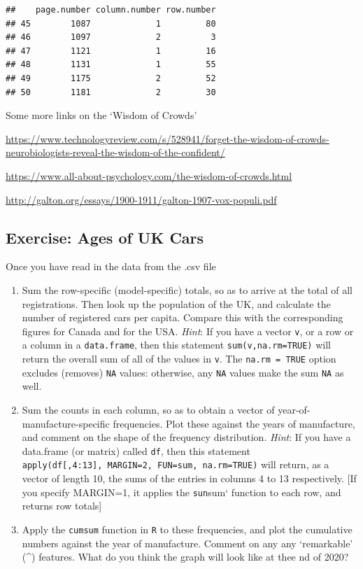 \documentclass[]{book}
\begin{document}
\begin{verbatim}
##    page.number column.number row.number
## 45        1087             1         80
## 46        1097             2          3
## 47        1121             1         16
## 48        1131             1         55
## 49        1175             2         52
## 50        1181             2         30
\end{verbatim}

Some more links on the `Wisdom of Crowds'

\url{https://www.technologyreview.com/s/528941/forget-the-wisdom-of-crowds-neurobiologists-reveal-the-wisdom-of-the-confident/}

\url{https://www.all-about-psychology.com/the-wisdom-of-crowds.html}

\url{http://galton.org/essays/1900-1911/galton-1907-vox-populi.pdf}

\hypertarget{exercise-ages-of-uk-cars}{%
\subsection{Exercise: Ages of UK Cars}\label{exercise-ages-of-uk-cars}}

Once you have read in the data from the .csv file

\begin{enumerate}
\def\labelenumi{\arabic{enumi}.}
\item
  Sum the row-specific (model-specific) totals, so as to arrive at the total of all registrations. Then look up the population of the UK, and calculate the number of registered cars per capita. Compare this with the corresponding figures for Canada and for the USA. \emph{Hint}: If you have a vector \texttt{v}, or a row or a column in a \texttt{data.frame}, then this statement \texttt{sum(v,na.rm=TRUE)} will return the overall sum of all of the values in \texttt{v}. The \texttt{na.rm\ =\ TRUE} option excludes (removes) \texttt{NA} values: otherwise, any \texttt{NA} values make the sum \texttt{NA} as well.
\item
  Sum the counts in each column, so as to obtain a vector of year-of-manufacture-specific frequencies. Plot these against the years of manufacture, and comment on the shape of the frequency distribution. \emph{Hint}: If you have a data.frame (or matrix) called \texttt{df}, then this statement \texttt{apply(df{[},4:13{]},\ MARGIN=2,\ FUN=sum,\ na.rm=TRUE)} will return, as a vector of length 10, the sums of the entries in columns 4 to 13 respectively. {[}If you specify MARGIN=1, it applies the \texttt{sun}sum` function to each row, and returns row totals{]}
\item
  Apply the \texttt{cumsum} function in \texttt{R} to these frequencies, and plot the cumulative numbers against the year of manufacture. Comment on any any `remarkable' (\^{}) features. What do you think the graph will look like at thee nd of 2020?
\end{enumerate}
\end{document}
